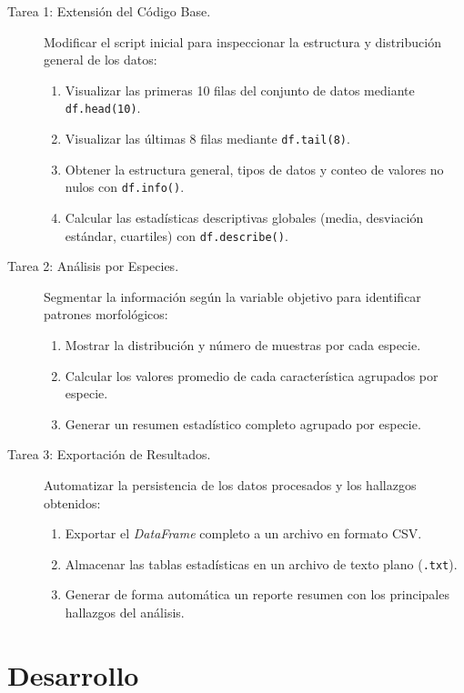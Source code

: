 \documentclass[11pt,letterpaper]{article}
\begin{document}
\begin{description}
    \item[Tarea 1: Extensión del Código Base.] Modificar el script inicial para inspeccionar la estructura y distribución general de los datos:
    \begin{enumerate}
        \item Visualizar las primeras 10 filas del conjunto de datos mediante \texttt{df.head(10)}.
        \item Visualizar las últimas 8 filas mediante \texttt{df.tail(8)}.
        \item Obtener la estructura general, tipos de datos y conteo de valores no nulos con \texttt{df.info()}.
        \item Calcular las estadísticas descriptivas globales (media, desviación estándar, cuartiles) con \texttt{df.describe()}.
    \end{enumerate}

    \item[Tarea 2: Análisis por Especies.] Segmentar la información según la variable objetivo para identificar patrones morfológicos:
    \begin{enumerate}
        \item Mostrar la distribución y número de muestras por cada especie.
        \item Calcular los valores promedio de cada característica agrupados por especie.
        \item Generar un resumen estadístico completo agrupado por especie.
    \end{enumerate}

    \item[Tarea 3: Exportación de Resultados.] Automatizar la persistencia de los datos procesados y los hallazgos obtenidos:
    \begin{enumerate}
        \item Exportar el \textit{DataFrame} completo a un archivo en formato CSV.
        \item Almacenar las tablas estadísticas en un archivo de texto plano (\texttt{.txt}).
        \item Generar de forma automática un reporte resumen con los principales hallazgos del análisis.
    \end{enumerate}
\end{description}

\section {Desarrollo}
\end{document}
